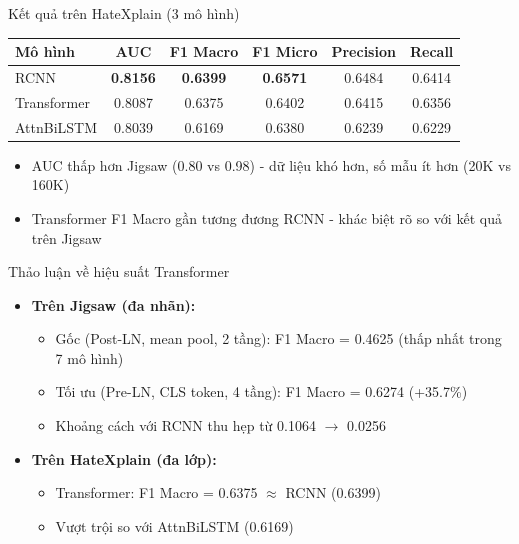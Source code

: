 \documentclass[serif, aspectratio=169]{beamer}
\begin{document}
\begin{frame}{Kết quả trên HateXplain (3 mô hình)}
\begin{table}
\centering
\small
\begin{tabular}{lccccc}
\toprule
\textbf{Mô hình} & \textbf{AUC} & \textbf{F1 Macro} & \textbf{F1 Micro} & \textbf{Precision} & \textbf{Recall} \\
\midrule
RCNN & \textbf{0.8156} & \textbf{0.6399} & \textbf{0.6571} & 0.6484 & 0.6414 \\
Transformer & 0.8087 & 0.6375 & 0.6402 & 0.6415 & 0.6356 \\
AttnBiLSTM & 0.8039 & 0.6169 & 0.6380 & 0.6239 & 0.6229 \\
\bottomrule
\end{tabular}
\end{table}
\vspace{0.2cm}
\begin{itemize}
    \item AUC thấp hơn Jigsaw (0.80 vs 0.98) - dữ liệu khó hơn, số mẫu ít hơn (20K vs 160K)
    \item Transformer F1 Macro gần tương đương RCNN - khác biệt rõ so với kết quả trên Jigsaw
\end{itemize}
\end{frame}

\begin{frame}{Thảo luận về hiệu suất Transformer}
\begin{itemize}
    \item \textbf{Trên Jigsaw (đa nhãn):}
    \begin{itemize}
        \item Gốc (Post-LN, mean pool, 2 tầng): F1 Macro = 0.4625 (thấp nhất trong 7 mô hình)
        \item Tối ưu (Pre-LN, CLS token, 4 tầng): F1 Macro = 0.6274 (+35.7\%)
        \item Khoảng cách với RCNN thu hẹp từ 0.1064 $\rightarrow$ 0.0256
    \end{itemize}
    \item \textbf{Trên HateXplain (đa lớp):}
    \begin{itemize}
        \item Transformer: F1 Macro = 0.6375 $\approx$ RCNN (0.6399)
        \item Vượt trội so với AttnBiLSTM (0.6169)
    \end{itemize}
\end{itemize}
\vspace{0.2cm}
\end{frame}
\end{document}
